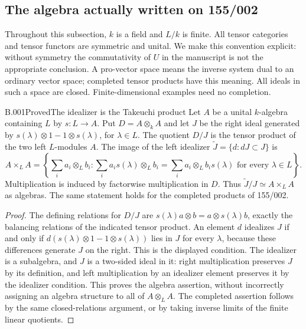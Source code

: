 \subsection{The algebra actually written on 155/002}

Throughout this subsection, $k$ is a field and $L/k$ is finite. All tensor
categories and tensor functors are symmetric and unital. We make this convention
explicit: without symmetry the commutativity of $U$ in the manuscript is not
the appropriate conclusion. A pro-vector space means the inverse system dual
to an ordinary vector space; completed tensor products have this meaning.
All ideals in such a space are closed. Finite-dimensional examples need no
completion.

\begin{saresult}{B.001}{Proved}{The idealizer is the Takeuchi product}
Let $A$ be a unital $k$-algebra containing $L$ by $s:L\longrightarrow A$.
Put $D=A\otimes_k A$ and let $J$ be the right ideal generated by
$s(\lambda)\otimes1-1\otimes s(\lambda)$, for $\lambda\in L$.
The quotient $D/J$ is the tensor product of the two left $L$-modules $A$.
The image of the left idealizer $\widetilde J=\{d:dJ\subset J\}$ is
\[
 A\mathbin{\times_L}A=
 \left\{\sum_i a_i\otimes_L b_i:
 \sum_i a_i s(\lambda)\otimes_L b_i
 =\sum_i a_i\otimes_L b_i s(\lambda)
 \text{ for every }\lambda\in L\right\}.
\]
Multiplication is induced by factorwise multiplication in $D$. Thus
$\widetilde J/J\simeq A\times_L A$ as algebras. The same statement holds
for the completed products of 155/002.
\end{saresult}
\begin{proof}
The defining relations for $D/J$ are
$s(\lambda)a\otimes b=a\otimes s(\lambda)b$, exactly the balancing
relations of the indicated tensor product. An element $d$ idealizes $J$
if and only if $d(s(\lambda)\otimes1-1\otimes s(\lambda))$ lies in $J$
for every $\lambda$, because these differences generate $J$ on the right.
This is the displayed condition. The idealizer is a subalgebra, and $J$
is a two-sided ideal in it: right multiplication preserves $J$ by its
definition, and left multiplication by an idealizer element preserves it
by the idealizer condition. This proves the algebra assertion, without
incorrectly assigning an algebra structure to all of $A\otimes_L A$.
The completed assertion follows by the same closed-relations argument,
or by taking inverse limits of the finite linear quotients.
\end{proof}

